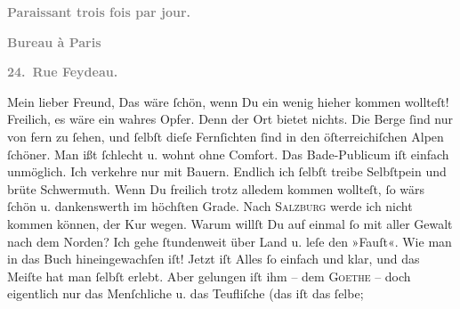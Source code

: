 \begin{ledgroupsized}[t]{13cm}
           \begin{otherlanguage}{french}\textcolor{gray}{\textbf{\textbf{Paraissant trois fois par jour.}}}\end{otherlanguage}\pend
           \pstart
           \begin{otherlanguage}{french}\textcolor{gray}{\textbf{\textbf{Bureau à Paris}}}\end{otherlanguage}\pend
           \pstart
           \begin{otherlanguage}{french}\textcolor{gray}{\textbf{\textbf{24. Rue Feydeau.}}}\end{otherlanguage}\pend
           \pstart\center{}Mein lieber Freund,\pend\pstart
           Das wäre ſchön, wenn Du ein wenig hieher kommen wollteſt! Freilich, es wäre ein
               wahres Opfer. Denn der Ort
               bietet nichts. Die Berge ſind nur von fern zu ſehen, und ſelbſt dieſe Fernſichten
               ſind in den öſterreichiſchen Alpen ſchöner. Man ißt ſchlecht u. wohnt ohne Comfort. Das
               Bade-Publicum iſt einfach unmöglich. Ich verkehre nur mit Bauern. {\pb}Endlich ich ſelbſt  treibe Selbſtpein und brüte Schwermuth. Wenn Du
               freilich trotz alledem kommen wollteſt, ſo wärs ſchön u. dankenswerth im höchſten
               Grade.\pend
           \pstart
           Nach \textsc{Salzburg} werde ich nicht kommen können, der Kur wegen.\pend
           \pstart
           Warum willſt Du auf einmal ſo mit aller Gewalt nach dem Norden?\pend
           \pstart
           Ich gehe ſtundenweit über Land u. leſe den »Fauſt«. Wie man in das {\pb}Buch hineingewachſen iſt!
               Jetzt iſt Alles ſo einfach und klar, und das Meiſte hat man ſelbſt erlebt. Aber
               gelungen iſt ihm – dem \textsc{Goethe} – doch eigentlich nur das Menſchliche u. das Teufliſche (das iſt das ſelbe;

\end{ledgroupsized}
